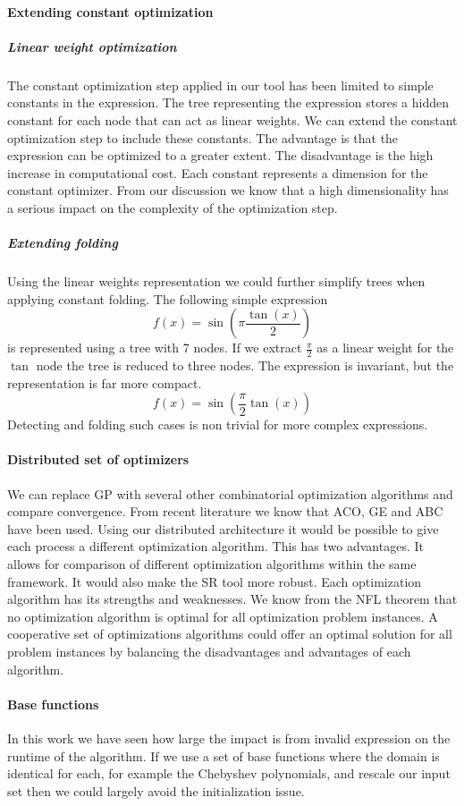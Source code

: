 \paragraph{Extending constant optimization}
\subparagraph{Linear weight optimization}
The constant optimization step applied in our tool has been limited to simple constants in the expression. The tree representing the expression stores a hidden constant for each node that can act as linear weights. We can extend the constant optimization step to include these constants. The advantage is that the expression can be optimized to a greater extent. The disadvantage is the high increase in computational cost. Each constant represents a dimension for the constant optimizer. From our discussion we know that a high dimensionality has a serious impact on the complexity of the optimization step. 
\subparagraph{Extending folding}
Using the linear weights representation we could further simplify trees when applying constant folding. The following simple expression
\[
f(x) = \sin( \pi \frac{\tan(x)}{2})
\]
is represented using a tree with 7 nodes. If we extract $\frac{\pi}{2}$ as a linear weight for the $\tan$ node the tree is reduced to three nodes. The expression is invariant, but the representation is far more compact.
\[
f(x) = \sin( \frac{\pi}{2} \tan(x))
\]
Detecting and folding such cases is non trivial for more complex expressions.

\paragraph{Distributed set of optimizers}
We can replace GP with several other combinatorial optimization algorithms and compare convergence. From recent literature we know that ACO, GE and ABC have been used. Using our distributed architecture it would be possible to give each process a different optimization algorithm. This has two advantages. It allows for comparison of different optimization algorithms within the same framework. It would also make the SR tool more robust. Each optimization algorithm has its strengths and weaknesses. We know from the NFL theorem that no optimization algorithm is optimal for all optimization problem instances. A cooperative set of optimizations algorithms could offer an optimal solution for all problem instances by balancing the disadvantages and advantages of each algorithm.

\paragraph{Base functions}
In this work we have seen how large the impact is from invalid expression on the runtime of the algorithm. If we use a set of base functions where the domain is identical for each, for example the Chebyshev polynomials, and rescale our input set then we could largely avoid the initialization issue.

